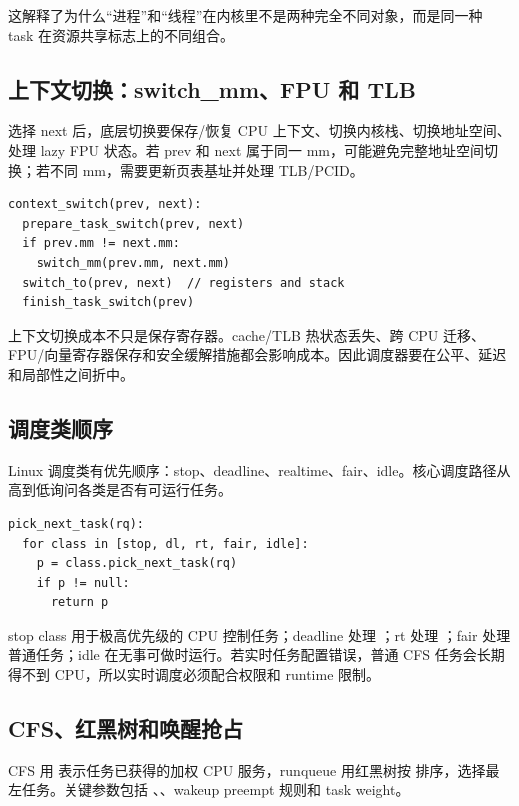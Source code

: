 这解释了为什么“进程”和“线程”在内核里不是两种完全不同对象，而是同一种 task 在资源共享标志上的不同组合。

\subsection{上下文切换：switch\_mm、FPU 和 TLB}

 选择 next 后，底层切换要保存/恢复 CPU 上下文、切换内核栈、切换地址空间、处理 lazy FPU 状态。若 prev 和 next 属于同一 mm，可能避免完整地址空间切换；若不同 mm，需要更新页表基址并处理 TLB/PCID。

\begin{lstlisting}
context_switch(prev, next):
  prepare_task_switch(prev, next)
  if prev.mm != next.mm:
    switch_mm(prev.mm, next.mm)
  switch_to(prev, next)  // registers and stack
  finish_task_switch(prev)
\end{lstlisting}

上下文切换成本不只是保存寄存器。cache/TLB 热状态丢失、跨 CPU 迁移、FPU/向量寄存器保存和安全缓解措施都会影响成本。因此调度器要在公平、延迟和局部性之间折中。

\subsection{调度类顺序}

Linux 调度类有优先顺序：stop、deadline、realtime、fair、idle。核心调度路径从高到低询问各类是否有可运行任务。

\begin{lstlisting}
pick_next_task(rq):
  for class in [stop, dl, rt, fair, idle]:
    p = class.pick_next_task(rq)
    if p != null:
      return p
\end{lstlisting}

stop class 用于极高优先级的 CPU 控制任务；deadline 处理 ；rt 处理 ；fair 处理普通任务；idle 在无事可做时运行。若实时任务配置错误，普通 CFS 任务会长期得不到 CPU，所以实时调度必须配合权限和 runtime 限制。

\subsection{CFS、红黑树和唤醒抢占}

CFS 用  表示任务已获得的加权 CPU 服务，runqueue 用红黑树按  排序，选择最左任务。关键参数包括 、、wakeup preempt 规则和 task weight。

